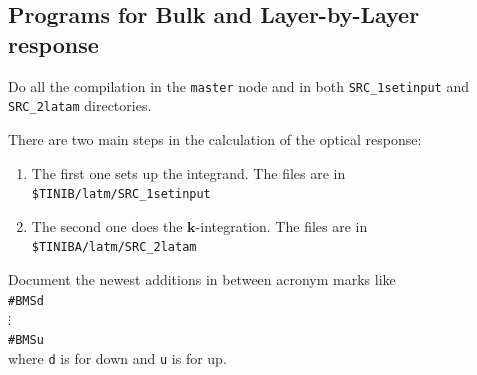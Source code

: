 \documentclass[12pt]{article}
\numberwithin{equation}{section}
\begin{document}
\subsection{Programs for Bulk and Layer-by-Layer response}
\label{sec:programs}

Do all the compilation in the \verb=master= node and in both 
\verb=SRC_1setinput=
and
\verb=SRC_2latam= directories.

There are two main steps in the calculation of the optical response:

\begin{enumerate}

\item The first one sets up the integrand. The
files are in\\
\verb=$TINIB/latm/SRC_1setinput=
\item The second one does the $\mathbf{k}$-integration. The files
  are in\\
\verb=$TINIBA/latm/SRC_2latam=
\end{enumerate}

Document the newest additions in between acronym marks like\\
\verb=#BMSd=\\
$\vdots$\\
\verb=#BMSu=\\
where \verb=d= is for down and \verb=u= is for up.
\end{document}
